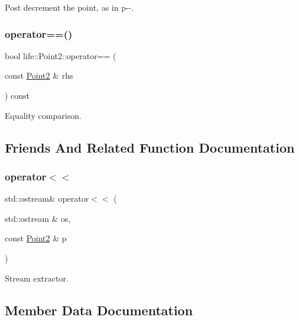 Post decrement the point, as in {\ttfamily p-\/-\/}. 

\mbox{\label{structlife_1_1_point2_a49365f204542c7716a842f6110fb012b}} 
\subsubsection{\texorpdfstring{operator==()}{operator==()}}
{\footnotesize\ttfamily bool life\+::\+Point2\+::operator== (\begin{DoxyParamCaption}\item[{const \mbox{\hyperlink{structlife_1_1_point2}{Point2}} \&}]{rhs }\end{DoxyParamCaption}) const\hspace{0.3cm}{\ttfamily [inline]}}



Equality comparison. 



\subsection{Friends And Related Function Documentation}
\mbox{\label{structlife_1_1_point2_a5b7b94167b12e9f06dc3cdecf3d19c65}} 
\subsubsection{\texorpdfstring{operator$<$$<$}{operator<<}}
{\footnotesize\ttfamily std\+::ostream\& operator$<$$<$ (\begin{DoxyParamCaption}\item[{std\+::ostream \&}]{os,  }\item[{const \mbox{\hyperlink{structlife_1_1_point2}{Point2}} \&}]{p }\end{DoxyParamCaption})\hspace{0.3cm}{\ttfamily [friend]}}



Stream extractor. 



\subsection{Member Data Documentation}
\mbox{\label{structlife_1_1_point2_af341f4da818e4699e52bb6e9bff041dd}} 
